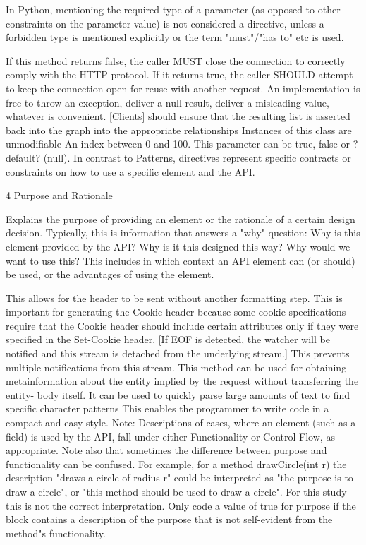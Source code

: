 In Python, mentioning the required type of a parameter (as opposed to other constraints on the parameter value) is not considered a directive, unless a forbidden type is mentioned explicitly or the term "must"/"has to" etc is used.

If this method returns false, the caller MUST close the connection to correctly comply with the HTTP protocol. If it returns true, the caller SHOULD attempt to keep the connection open for reuse with another request.
An implementation is free to throw an exception, deliver a null result, deliver a misleading value, whatever is convenient.
[Clients] should ensure that the resulting list is asserted back into the graph into the appropriate relationships
Instances of this class are unmodifiable
An index between 0 and 100.
This parameter can be true, false or ?default? (null).
In contrast to Patterns, directives represent specific contracts or constraints on how to use a specific element and the API.

4 Purpose and Rationale

Explains the purpose of providing an element or the rationale of a certain design decision. Typically, this is information that answers a "why" question: Why is this element provided by the API? Why is it this designed this way? Why would we want to use this? This includes in which context an API element can (or should) be used, or the advantages of using the element.

This allows for the header to be sent without another formatting step.
This is important for generating the Cookie header because some cookie specifications require that the Cookie header should include certain attributes only if they were specified in the Set-Cookie header.
[If EOF is detected, the watcher will be notified and this stream is detached from the underlying stream.] This prevents multiple notifications from this stream.
This method can be used for obtaining metainformation about the entity implied by the request without transferring the entity- body itself.
It can be used to quickly parse large amounts of text to find specific character patterns
This enables the programmer to write code in a compact and easy style.
Note: Descriptions of cases, where an element (such as a field) is used by the API, fall under either Functionality or Control-Flow, as appropriate. Note also that sometimes the difference between purpose and functionality can be confused. For example, for a method drawCircle(int r) the description "draws a circle of radius r" could be interpreted as "the purpose is to draw a circle", or "this method should be used to draw a circle". For this study this is not the correct interpretation. Only code a value of true for purpose if the block contains a description of the purpose that is not self-evident from the method"s functionality.

